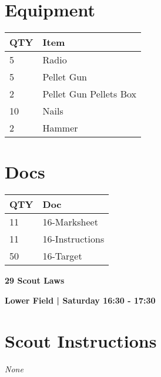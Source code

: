 \documentclass[10pt]{article}
\newcommand{\newtitle}[1]{\begin{center}{\Huge\bfseries #1 }\\ \vspace{5mm}\end{center}}
\newcommand{\newsubtitle}[1]{\begin{center}{\color{grey}\Large\bfseries #1 }\\ \vspace{5mm}\end{center}}
\begin{document}
	\begin{multicols}{2}

		\section*{\faWrench \: Equipment}

		
	\begin{center}
			\begin{tabular}{p{2cm}p{4cm}}


				\textbf{QTY} & \textbf{Item} \\\toprule
												5&Radio\\\midrule
												5&Pellet Gun\\\midrule
												2&Pellet Gun Pellets Box\\\midrule
												10&Nails\\\midrule
												2&Hammer\\\midrule
								\end{tabular}

			\end{center}

		
		\vfill\null
		\columnbreak

			\section*{\faFile \: Docs}
		 	\begin{center}
			\begin{tabular}{p{2cm}p{4cm}}

			\textbf{QTY} & \textbf{Doc} \\\toprule
										11&16-Marksheet\\\midrule
										11&16-Instructions\\\midrule
										50&16-Target\\\midrule
							\end{tabular}
			\end{center}
	

		\vfill\null

		\end{multicols}



	\vspace{1cm}


	\clearpage
		\newtitle{29 Scout Laws }
	\newsubtitle{Lower Field | Saturday 16:30 - 17:30}
		\setcounter{section}{28}
	\section*{Scout Instructions}
		\textit{None}
	
\end{document}

